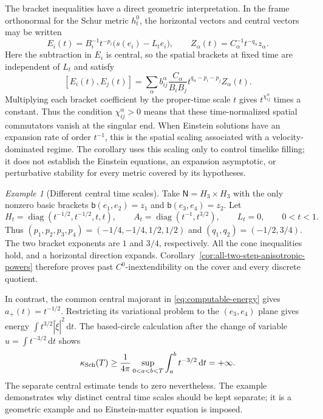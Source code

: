 \documentclass[10pt,a4paper]{article}
\numberwithin{equation}{section}
\theoremstyle{definition}
\theoremstyle{remark}
\newtheorem{example}[theorem]{Example}
\newcommand{\dd}{\mathrm d}
\begin{document}
The bracket inequalities have a direct geometric interpretation.  In
the frame orthonormal for the Schur metric $h_t^0$, the horizontal
vectors and central vectors may be written
\[
 E_i(t)=B_i^{-1}t^{-p_i}\bigl(s(e_i)-L_te_i\bigr),\qquad
 Z_\alpha(t)=C_\alpha^{-1}t^{-q_\alpha}z_\alpha.
\]
Here the subtraction in $E_i$ is central, so the spatial brackets at
fixed time are independent of $L_t$ and satisfy
\[
 [E_i(t),E_j(t)]
 =\sum_\alpha b_{ij}^{\alpha}
       \frac{C_\alpha}{B_iB_j}
       t^{q_\alpha-p_i-p_j}Z_\alpha(t).
\]
Multiplying each bracket coefficient by the proper-time scale $t$
gives $t^{\chi_{ij}^{\alpha}}$ times a constant.  Thus the condition
$\chi_{ij}^{\alpha}>0$ means that these time-normalized spatial
commutators vanish at the singular end.  When Einstein solutions have
an expansion rate of order $t^{-1}$, this is the spatial scaling
associated with a velocity-dominated regime.  The corollary uses this
scaling only to control timelike filling; it does not establish the
Einstein equations, an expansion asymptotic, or perturbative stability
for every metric covered by its hypotheses.

\begin{example}[Different central time scales]
\label{ex:two-central-time-scales}
Take $\mathsf N=H_3\times H_3$ with the only nonzero basic brackets
$\mathsf b(e_1,e_2)=z_1$ and $\mathsf b(e_3,e_4)=z_2$.  Let
\[
 H_t=\operatorname{diag}(t^{-1/2},t^{-1/2},t,t),
 \qquad A_t=\operatorname{diag}(t^{-1},t^{3/2}),
 \qquad L_t=0,
 \qquad 0<t<1.
\]
Thus $(p_1,p_2,p_3,p_4)=(-1/4,-1/4,1/2,1/2)$ and
$(q_1,q_2)=(-1/2,3/4)$.  The two bracket exponents are $1$ and
$3/4$, respectively.  All the cone inequalities hold, and a horizontal
direction expands.  Corollary~\ref{cor:all-two-step-anisotropic-powers}
therefore proves past $C^0$-inextendibility on the cover and every
discrete quotient.

In contrast, the common central majorant in
\eqref{eq:computable-energy} gives $a_+(t)=t^{-1/2}$.
Restricting its variational problem to the $(e_3,e_4)$ plane gives
energy $\int t^{3/2}|\dot\xi|^2\,\dd t$.  The based-circle
calculation after the change of variable
$u=\int t^{-3/2}\,\dd t$ shows
\[
 \kappa_{\rm Sch}(T)\ge
 \frac1{4\pi}\sup_{0<a<b<T}\int_a^b t^{-3/2}\,\dd t
 =+\infty.
\]
The separate central estimate tends to zero nevertheless.  The
example demonstrates why distinct central time scales should be kept
separate; it is a geometric example and no Einstein-matter equation
is imposed.
\end{example}
\end{document}
